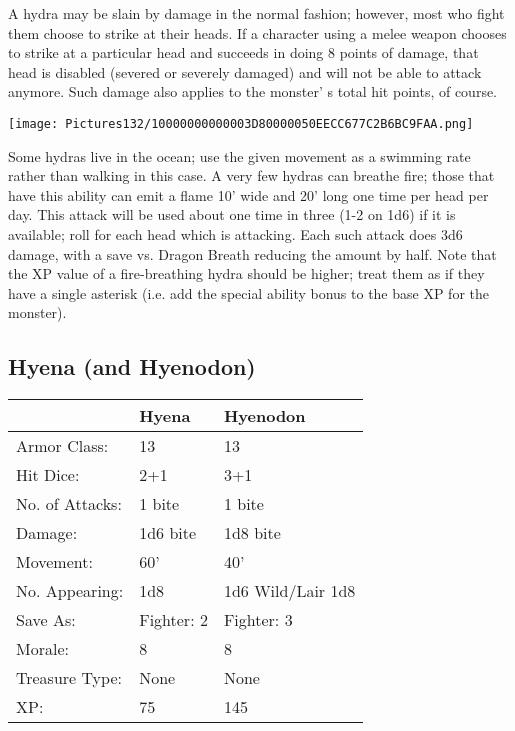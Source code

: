 \documentclass[a4paper,twoside,openany,10pt]{book}
\begin{document}
\begin{multicols}{2}
A hydra may be slain by damage in the normal fashion; however, most who fight them choose to strike at their heads. If a character using a melee weapon chooses to strike at a particular head and succeeds in doing 8 points of damage, that head is disabled (severed or severely damaged) and will not be able to attack anymore. Such damage also applies to the monster' s total hit points, of course.

\begin{center}
	\texttt{[image: Pictures132/10000000000003D80000050EECC677C2B6BC9FAA.png]}
\end{center}

Some hydras live in the ocean; use the given movement as a swimming rate rather than walking in this case. A very few hydras can breathe fire; those that have this ability can emit a flame 10' wide and 20' long one time per head per day. This attack will be used about one time in three (1-2 on 1d6) if it is available; roll for each head which is attacking. Each such attack does 3d6 damage, with a save vs. Dragon Breath reducing the amount by half. Note that the XP value of a fire-breathing hydra should be higher; treat them as if they have a single asterisk (i.e. add the special ability bonus to the base XP for the monster).


\subsection*{Hyena (and Hyenodon)}\label{hyena-and-hyenodon}

\begin{tabularx}{0.50\textwidth}{@{}llX@{}}
& Hyena & Hyenodon \\\hline
Armor Class: & 13 & 13 \\\hline
Hit Dice: & 2+1 & 3+1 \\\hline
No. of Attacks: & 1 bite & 1 bite \\\hline
Damage: & 1d6 bite & 1d8 bite \\\hline
Movement: & 60' & 40' \\\hline
No. Appearing: & 1d8 & 1d6 Wild/Lair 1d8 \\\hline
Save As: & Fighter: 2 & Fighter: 3 \\\hline
Morale: & 8 & 8 \\\hline
Treasure Type: & None & None \\\hline
XP: & 75 & 145 \\\hline
\end{tabularx}\medskip


\end{multicols}
\end{document}
